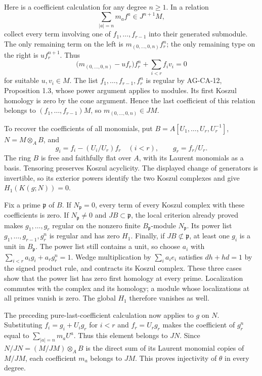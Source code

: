 \documentclass[11pt,a4paper,openany]{report}
\begin{document}
Here is a coefficient calculation for any degree \(n\geq1\). In a relation \[\sum_{|a|=n}m_af^a\in J^{n+1}M,\] collect every term involving one of \(f_1,\ldots,f_{r-1}\) into their generated submodule. The only remaining term on the left is \(m_{(0,\ldots,0,n)}f_r^n\); the only remaining type on the right is \(u f_r^{n+1}\). Thus \[\bigl(m_{(0,\ldots,0,n)}-uf_r\bigr)f_r^n+\sum_{i<r}f_iv_i=0\] for suitable \(u,v_i\in M\). The list \(f_1,\ldots,f_{r-1},f_r^n\) is regular by AG-CA-12, Proposition 1.3, whose power argument applies to modules. Its first Koszul homology is zero by the cone argument. Hence the last coefficient of this relation belongs to \((f_1,\ldots,f_{r-1})M\), so \(m_{(0,\ldots,0,n)}\in JM\).

To recover the coefficients of all monomials, put \(B=A[U_1,\ldots,U_r,U_r^{-1}]\), \(N=M\otimes_AB\), and \[g_i=f_i-(U_i/U_r)f_r\quad(i<r),\qquad g_r=f_r/U_r.\] The ring \(B\) is free and faithfully flat over \(A\), with its Laurent monomials as a basis. Tensoring preserves Koszul acyclicity. The displayed change of generators is invertible, so its exterior powers identify the two Koszul complexes and give \(H_1(K(g;N))=0\).

Fix a prime \(\mathfrak p\) of \(B\). If \(N_{\mathfrak p}=0\), every term of every Koszul complex with these coefficients is zero. If \(N_{\mathfrak p}\ne0\) and \(JB\subset\mathfrak p\), the local criterion already proved makes \(g_1,\ldots,g_r\) regular on the nonzero finite \(B_{\mathfrak p}\)-module \(N_{\mathfrak p}\). Its power list \(g_1,\ldots,g_{r-1},g_r^n\) is regular and has zero \(H_1\). Finally, if \(JB\not\subset\mathfrak p\), at least one \(g_i\) is a unit in \(B_{\mathfrak p}\). The power list still contains a unit, so choose \(a_i\) with \(\sum_{i<r}a_ig_i+a_rg_r^n=1\). Wedge multiplication by \(\sum_i a_ie_i\) satisfies \(dh+hd=1\) by the signed product rule, and contracts its Koszul complex. These three cases show that the power list has zero first homology at every prime. Localization commutes with the complex and its homology; a module whose localizations at all primes vanish is zero. The global \(H_1\) therefore vanishes as well.

The preceding pure-last-coefficient calculation now applies to \(g\) on \(N\). Substituting \(f_i=g_i+U_ig_r\) for \(i<r\) and \(f_r=U_rg_r\) makes the coefficient of \(g_r^n\) equal to \(\sum_{|a|=n}m_aU^a\). Thus this element belongs to \(JN\). Since \(N/JN=(M/JM)\otimes_AB\) is the direct sum of its Laurent monomial copies of \(M/JM\), each coefficient \(m_a\) belongs to \(JM\). This proves injectivity of \(\theta\) in every degree.
\end{document}
